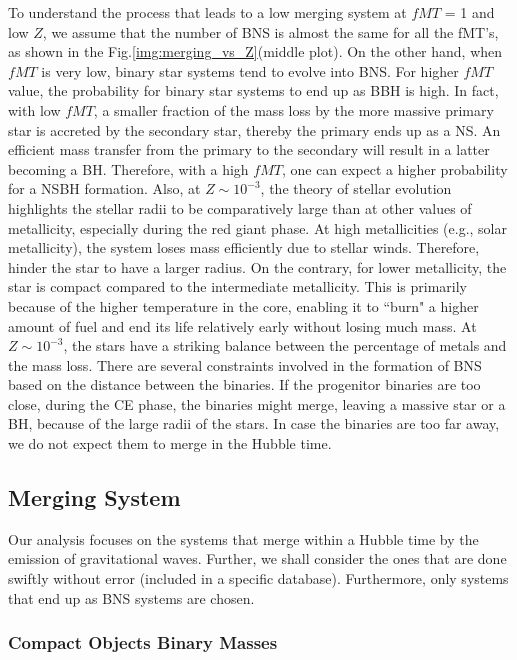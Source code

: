 \documentclass[preprint,12pt]{elsarticle}
\begin{document}
To understand the process that leads to a low merging system at $fMT$ = 1 and low $Z$, we assume that the number of BNS is almost the same for all the fMT's, as shown in the Fig.\ref{img:merging_vs_Z}(middle plot). On the other hand, when $fMT$ is very low, binary star systems tend to evolve into BNS. For higher $fMT$ value, the probability for binary star systems to end up as BBH is high. In fact, with low $fMT$, a smaller fraction of the mass loss by the more massive primary star is accreted by the secondary star, thereby the primary ends up as a NS. An efficient mass transfer from the primary to the secondary will result in a latter becoming a BH. Therefore, with a high $fMT$, one can expect a higher probability for a NSBH formation. Also, at $Z \sim 10^{-3}$, the theory of stellar evolution highlights the stellar radii to be comparatively large than at other values of metallicity, especially during the red giant phase. At high metallicities (e.g., solar metallicity), the system loses mass efficiently due to stellar winds. Therefore, hinder the star to have a larger radius. On the contrary, for lower metallicity, the star is compact compared to the intermediate metallicity. This is primarily because of the higher temperature in the core, enabling it to ``burn" a higher amount of fuel and end its life relatively early without losing much mass. At $Z \sim 10^{-3}$, the stars have a striking balance between the percentage of metals and the mass loss. There are several constraints involved in the formation of BNS based on the distance between the binaries. If the progenitor binaries are too close, during the CE phase, the binaries might merge, leaving a massive star or a BH, because of the large radii of the stars. In case the binaries are too far away, we do not expect them to merge in the Hubble time.

\subsection{\textbf{Merging System}}
Our analysis focuses on the systems that merge within a Hubble time by the emission of gravitational waves. Further, we shall consider the ones that are done swiftly without error (included in a specific database). Furthermore, only systems that end up as BNS systems are chosen.

\subsubsection{\textbf{Compact Objects Binary Masses}}
\end{document}
